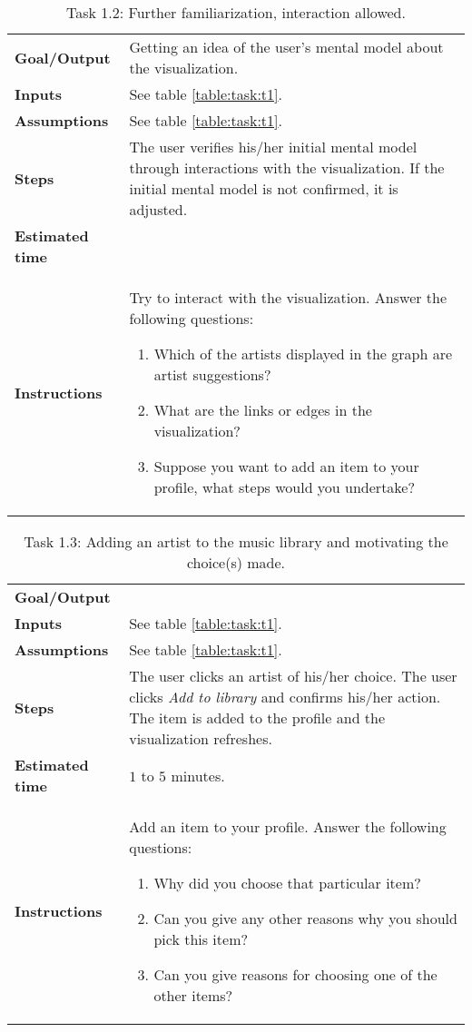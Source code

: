 \begin{table}
	\caption{Task 1.2: Further familiarization, interaction allowed.}
	\begin{tabular}{ p{80px} | p{350px} }
		\hline
		\textbf{Goal/Output}			& Getting an idea of the user's mental model about the visualization. \\
		\textbf{Inputs}						& See table \ref{table:task:t1}. \\
		\textbf{Assumptions}			& See table \ref{table:task:t1}. \\
		\textbf{Steps}						& The user verifies his/her initial mental model through interactions with the visualization. If the initial mental model is not confirmed, it is adjusted. \\
		\textbf{Estimated time} 	& \\
		\textbf{Instructions}			&
		Try to interact with the visualization. Answer the following questions:
		\begin{enumerate}
			\item Which of the artists displayed in the graph are artist suggestions?
			\item What are the links or edges in the visualization?
			\item	Suppose you want to add an item to your profile, what steps would you undertake?
		\end{enumerate}
		\\
		\hline
	\end{tabular}
	\label{table:task:t2}
\end{table}


\begin{table}
	\caption{Task 1.3: Adding an artist to the music library and motivating the choice(s) made.}
	\begin{tabular}{ p{80px} | p{350px} }
		\hline
		\textbf{Goal/Output}			& \\
		\textbf{Inputs}						& See table \ref{table:task:t1}. \\
		\textbf{Assumptions}			& See table \ref{table:task:t1}. \\
		\textbf{Steps}						& The user clicks an artist of his/her choice. The user clicks \emph{Add to library} and confirms his/her action. The item is added to the profile and the visualization refreshes. \\
		\textbf{Estimated time} 	& $1$ to $5$ minutes. \\
		\textbf{Instructions}			&
		Add an item to your profile. Answer the following questions:
		\begin{enumerate}
			\item Why did you choose that particular item?
			\item Can you give any other reasons why you should pick this item?
			\item Can you give reasons for choosing one of the other items?
		\end{enumerate}
		\\
		\hline
	\end{tabular}
	\label{table:task:t3}
\end{table}



